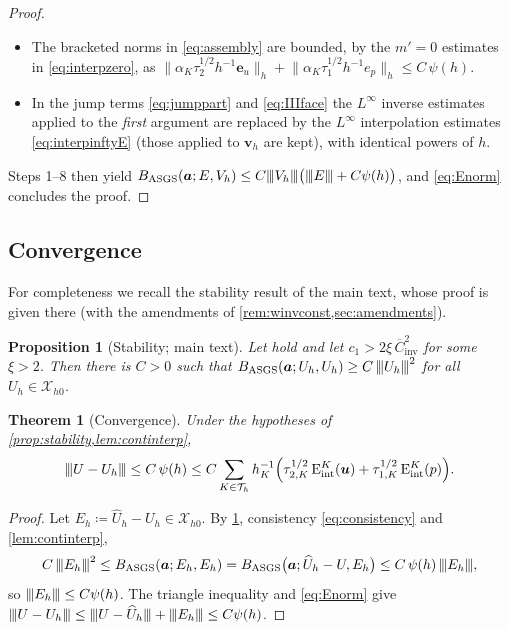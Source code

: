 \documentclass[11pt,a4paper]{article}
\newcommand{\bu}{\boldsymbol{u}}
\newcommand{\ba}{\boldsymbol{a}}
\newcommand{\beu}{\boldsymbol{e}_{u}}
\newcommand{\bvh}{\boldsymbol{v}_h}
\newcommand{\Th}{\mathcal{T}_h}
\newcommand{\Xh}{\mathcal{X}_{h0}}
\newcommand{\Cinva}{\overline{C}_{\mathrm{inv}}}
\newcommand{\triplenorm}[1]{{\lvert\kern-0.25ex\lvert\kern-0.25ex\lvert #1
\rvert\kern-0.25ex\rvert\kern-0.25ex\rvert}}
\newcommand{\Eint}[2]{\mathrm{E}^{#1}_{\mathrm{int}}(#2)}
\theoremstyle{plain}
\newtheorem{theorem}[lemma]{Theorem}
\newtheorem{proposition}[lemma]{Proposition}
\theoremstyle{remark}
\theoremstyle{definition}
\numberwithin{equation}{section}
\begin{document}
\begin{proof}
\begin{itemize}[leftmargin=2em]
\item The bracketed norms in \eqref{eq:assembly} are bounded, by the $m'=0$ estimates in
\eqref{eq:interpzero}, as
$\bigl\lVert\alpha_K\tau_2^{1/2}h^{-1}\beu\bigr\rVert_h
+\bigl\lVert\alpha_K\tau_1^{1/2}h^{-1}e_p\bigr\rVert_h\le C\,\psi(h)$.
\item In the jump terms \eqref{eq:jumppart} and \eqref{eq:IIIface} the $L^\infty$ inverse
estimates applied to the \emph{first} argument are replaced by the $L^\infty$
interpolation estimates \eqref{eq:interpinftyE} (those applied to $\bvh$ are kept), with
identical powers of $h$.
\end{itemize}
Steps 1--8 then yield
$B_{\mathrm{ASGS}}(\ba;E,V_h)\le C\triplenorm{V_h}\bigl(\triplenorm{E}+C\psi(h)\bigr)$, and
\eqref{eq:Enorm} concludes the proof.
\end{proof}

\subsection{Convergence}
For completeness we recall the stability result of the main text, whose proof is given
there (with the amendments of \cref{rem:winvconst,sec:amendments}).

\begin{proposition}[Stability; main text]\label{prop:stability}
Let  hold and let $c_1>2\xi\,\Cinva^2$ for some $\xi>2$. Then
there is $C>0$ such that
$B_{\mathrm{ASGS}}(\ba;U_h,U_h)\ge C\,\triplenorm{U_h}^2$ for all $U_h\in\Xh$.
\end{proposition}

\begin{theorem}[Convergence]\label{thm:convergence}
Under the hypotheses of \cref{prop:stability,lem:continterp},
\begin{equation}\label{eq:convergence}
  \triplenorm{U-U_h}
  \le C\,\psi(h)
  \le C\sum_{K\in\Th}h_K^{-1}
  \Bigl(\tau_{2,K}^{1/2}\,\Eint{K}{\bu}+\tau_{1,K}^{1/2}\,\Eint{K}{p}\Bigr).
\end{equation}
\end{theorem}

\begin{proof}
Let $E_h\coloneqq\widehat{U}_h-U_h\in\Xh$. By \cref{prop:stability}, consistency
\eqref{eq:consistency} and \cref{lem:continterp},
\begin{equation*}
  C\,\triplenorm{E_h}^2
  \le B_{\mathrm{ASGS}}(\ba;E_h,E_h)
  = B_{\mathrm{ASGS}}\bigl(\ba;\widehat{U}_h-U,E_h\bigr)
  \le C\,\psi(h)\,\triplenorm{E_h},
\end{equation*}
so $\triplenorm{E_h}\le C\psi(h)$. The triangle inequality and \eqref{eq:Enorm} give
$\triplenorm{U-U_h}\le\triplenorm{U-\widehat{U}_h}+\triplenorm{E_h}\le C\psi(h)$.
\end{proof}
\end{document}
